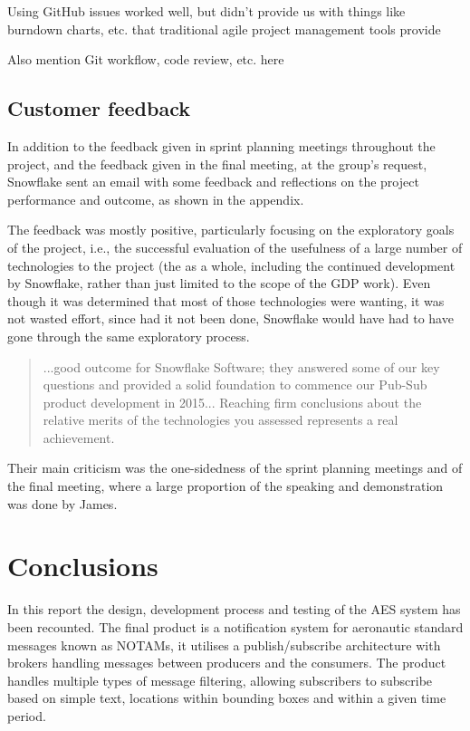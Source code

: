 \documentclass[a4paper, 12pt, twoside]{article}
\begin{document}
Using GitHub issues worked well, but didn't provide us with things like burndown charts, etc. that traditional agile project management tools provide

Also mention Git workflow, code review, etc. here

\subsection{Customer feedback}
\label{sec:eval_customer_feedback}

In addition to the feedback given in sprint planning meetings throughout the project, and the feedback given in the final meeting, at the group's request, Snowflake sent an email with some feedback and reflections on the project performance and outcome, as shown in the appendix.

The feedback was mostly positive, particularly focusing on the exploratory goals of the project, i.e., the successful evaluation of the usefulness of a large number of technologies to the project (the as a whole, including the continued development by Snowflake, rather than just limited to the scope of the GDP work). Even though it was determined that most of those technologies were wanting, it was not wasted effort, since had it not been done, Snowflake would have had to have gone through the same exploratory process.

\blockquote{...good outcome for Snowflake Software; they answered some of our key questions and provided a solid foundation to commence our Pub-Sub product development in 2015... Reaching firm conclusions about the relative merits of the technologies you assessed represents a real achievement.}

Their main criticism was the one-sidedness of the sprint planning meetings and of the final meeting, where a large proportion of the speaking and demonstration was done by James.

\section{Conclusions}
\label{sec:conclusions}

In this report the design, development process and testing of the AES system has been recounted. The final product is a notification system for aeronautic standard messages known as NOTAMs, it utilises a publish/subscribe architecture with brokers handling messages between producers and the consumers. The product handles multiple types of message filtering, allowing subscribers to subscribe based on simple text, locations within bounding boxes and within a given time period.
\end{document}
